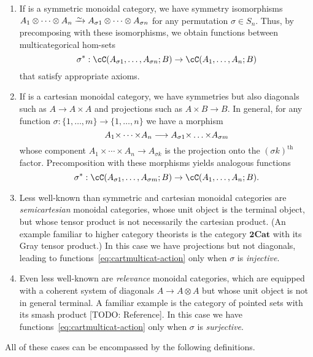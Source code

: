 \documentclass{book}
\let\tensor\otimes
\begin{document}
\begin{enumerate}
\item If \cC is a symmetric monoidal category, we have symmetry isomorphisms $A_1\tensor\cdots\tensor A_n\toiso A_{\sigma 1}\tensor\cdots\tensor A_{\sigma n}$ for any permutation $\sigma\in S_n$.
  Thus, by precomposing with these isomorphisms, we obtain functions between multicategorical hom-sets
  \[\sigma^*: \cC(A_{\sigma 1},\dots,A_{\sigma n}; B) \to \cC(A_1,\dots,A_n;B) \]
  that satisfy appropriate axioms.
\item If \cC is a cartesian monoidal category, we have symmetries but also diagonals such as $A\to A\times A$ and projections such as $A\times B \to B$.
  In general, for any function $\sigma : \{1,\dots,m\} \to \{1,\dots,n\}$ we have a morphism
  \[ A_1\times \cdots\times A_n \too A_{\sigma 1} \times\dots\times A_{\sigma m} \]
  whose component $A_1\times \cdots\times A_n \to A_{\sigma k}$ is the projection onto the $(\sigma k)^{\mathrm{th}}$ factor.
  Precomposition with these morphisms yields analogous functions
  \begin{equation}
    \sigma^*: \cC(A_{\sigma 1},\dots,A_{\sigma m}; B) \to \cC(A_1,\dots,A_n;B).\label{eq:cartmulticat-action}
  \end{equation}
\item Less well-known than symmetric and cartesian monoidal categories are \emph{semicartesian} monoidal categories, whose unit object is the terminal object, but whose tensor product is not necessarily the cartesian product.
  (An example familiar to higher category theorists is the category $\mathbf{2Cat}$ with its Gray tensor product.)
  In this case we have projections but not diagonals, leading to functions~\eqref{eq:cartmulticat-action} only when $\sigma$ is \emph{injective}.
\item Even less well-known are \emph{relevance} monoidal categories, which are equipped with a coherent system of diagonals $A \to A\tensor A$ but whose unit object is not in general terminal.
  A familiar example is the category of pointed sets with its smash product [TODO: Reference].
  In this case we have functions~\eqref{eq:cartmulticat-action} only when $\sigma$ is \emph{surjective}.
\end{enumerate}

All of these cases can be encompassed by the following definitions.
\end{document}
